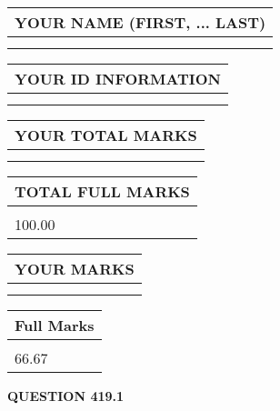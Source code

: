 \documentclass{ctexart}
\begin{document}
   
   
   
\newpage 
\setcounter{page}{ 
   419001 } 
   
   
   
   
\noindent\begin{tabular}{|l|}
\hline
YOUR NAME (FIRST, ... LAST)  \\
\hline
 \\ 
 \\ 
\hline
\end{tabular}
\hspace{0.05in} \begin{tabular}{|l|}
\hline
 YOUR   ID   INFORMATION  \\
\hline
 \\ 
 \\ 
\hline
\end{tabular}
   
   
\vspace{0.2in}\noindent\begin{tabular}{|l|}
\hline
YOUR TOTAL MARKS  \\
\hline
 \\ 
 \\ 
\hline
\end{tabular}
\hspace{0.05in} \begin{tabular}{|l|}
\hline
TOTAL FULL MARKS  \\
\hline
 \\ 
100.00 \\
\hline
\end{tabular}
   
   
 \vspace{0.2in}
 
 
 
 
   
   
  
\vspace{0.2in}
  
\noindent\begin{tabular}{|l|}
\hline
 YOUR MARKS  \\
\hline
 \\ 
 \\ 
\hline
\end{tabular}
\hspace{0.05in} \begin{tabular}{|l|}
\hline
 Full Marks  \\
\hline
 \\ 
66.67 \\
\hline
\end{tabular}
{\textbf{\Large{QUESTION
419.1 
}}}
  
\end{document}
